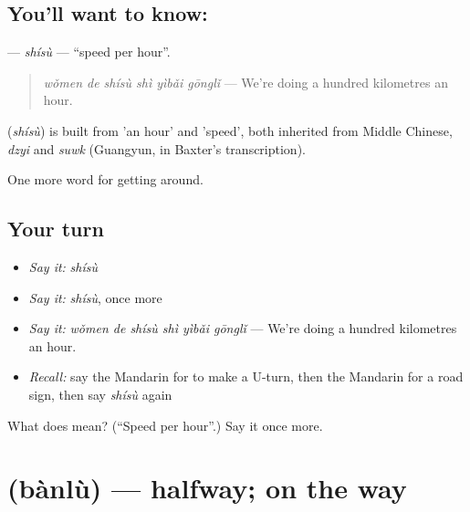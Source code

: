 \subsection*{You'll want to know: }
\textbf{} — \emph{shísù} — \textquotedblleft{}speed per hour\textquotedblright{}.

\begin{quote}
\textbf{} \emph{wǒmen de shísù shì yìbǎi gōnglǐ} — We're doing a hundred kilometres an hour.
\end{quote}

\begin{cousinweb}
\textbf{} (\emph{shísù}) is built from  'an hour' and  'speed', both inherited from Middle Chinese, \emph{dzyi} and \emph{suwk} (Guangyun, in Baxter's transcription).
\end{cousinweb}

\begin{grammarlens}[title={What you've built}]
One more word for getting around.
\end{grammarlens}

\subsection*{Your turn}
\begin{itemize}
\raggedright
  \item \emph{Say it:} \emph{shísù}
  \item \emph{Say it:} \emph{shísù}, once more
  \item \emph{Say it:} \emph{wǒmen de shísù shì yìbǎi gōnglǐ} — We're doing a hundred kilometres an hour.
  \item \emph{Recall:} say the Mandarin for to make a U-turn, then the Mandarin for a road sign, then say \emph{shísù} again
\end{itemize}

\begin{tcolorbox}[breakable,colback=teal!4,colframe=teal!35!black,title={Before you move on}]
What does  mean? (\textquotedblleft{}Speed per hour\textquotedblright{}.) Say it once more.
\end{tcolorbox}
\section[\texorpdfstring{\zh{半路} (bànlù)}{半路 (bànlù)}]{ (bànlù) — halfway; on the way}

\label{lesson:ZH-C424-banlu}



